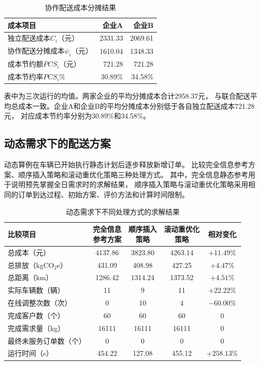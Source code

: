 \documentclass{setp-new}
\newcommand{\setptabsetup}{\small\renewcommand{\arraystretch}{0.95}\setlength{\tabcolsep}{2.2pt}\hbadness=10000}
\begin{document}
\begin{table}[H]
  \centering
  \caption{协作配送成本分摊结果}
  \label{tab:allocation}
  \small
  \begin{tabular*}{\textwidth}{@{\extracolsep{\fill}}lrr}
    \toprule
    成本项目 & 企业A & 企业B\\
    \midrule
    独立配送成本$C_i$（元） & 2331.33 & 2069.61\\
    协作配送分摊成本$\psi_i$（元） & 1610.04 & 1348.33\\
    成本节约额$PCS_i$（元） & 721.28 & 721.28\\
    成本节约率$PCS_i\%$ & 30.89\% & 34.58\%\\
    \bottomrule
  \end{tabular*}
\end{table}

表中为三次运行的均值。两家企业的平均分摊成本合计2958.37元，
与联合配送平均总成本一致。企业A和企业B的平均分摊成本分别低于各自独立配送成本721.28元，
对应成本节约率分别为30.89\%和34.58\%。

\subsection{动态需求下的配送方案}

动态算例在车辆已开始执行静态计划后逐步释放新增订单。
比较完全信息参考方案、顺序插入策略和滚动重优化策略三种处理方式。
其中，完全信息静态参考用于说明预先掌握全日需求时的求解结果，
顺序插入策略与滚动重优化策略采用相同的订单到达过程、初始方案、评价方法和计算时间限制。

\begin{table}[H]
  \centering
  \caption{动态需求下不同处理方式的求解结果}
  \label{tab:dynamic}
  \setptabsetup
  \begin{tabular*}{\linewidth}{@{\extracolsep{\fill}}lcccc@{}}
    \toprule
    比较项目 & \makecell{完全信息\\参考方案} & \makecell{顺序插入\\策略} & \makecell{滚动重优化\\策略} & 相对变化\\
    \midrule
    总成本（元） & 4137.86 & 3823.80 & 4263.14 & $+11.49\%$\\
    总排放（kgCO$_2$e） & 431.09 & 408.98 & 427.25 & $+4.47\%$\\
    总距离（km） & 1286.42 & 1314.24 & 1373.52 & $+4.51\%$\\
    实际车辆数（辆） & 11 & 9 & 11 & $+22.22\%$\\
    在线调整次数（次） & 0 & 10 & 4 & $-60.00\%$\\
    完成客户数（个） & 60 & 60 & 60 & 0\\
    完成需求量（kg） & 16111 & 16111 & 16111 & 0\\
    最终未服务订单数（个） & 0 & 0 & 0 & 0\\
    运行时间（s） & 454.22 & 127.08 & 455.12 & $+258.13\%$\\
    \bottomrule
  \end{tabular*}
\end{table}
\end{document}
